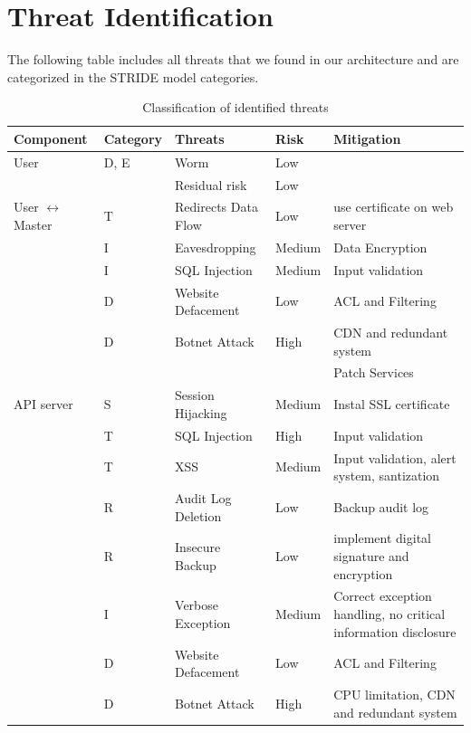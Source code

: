 \section{Threat Identification}
The following table includes all threats that we found in our architecture and are categorized in the STRIDE model categories.
\begin{longtable}[h!]{p{2.1cm} p{1.8cm} p{3cm} p{2cm} p{3.5cm}}
    \caption{\label{tab:threats-classification}Classification of identified threats}
    \endfirsthead
    \textbf{Component} & \textbf{Category} & \textbf{Threats} & \textbf{Risk} & \textbf{Mitigation} \\
    \endhead
    \hline
    User                & D, E & Worm & Low & \\
                        & & Residual risk & Low & \\
    \hline
    User \(\leftrightarrow\) Master   
                        & T & Redirects Data Flow & Low & use certificate on web server \\ 
                        & I & Eavesdropping & Medium & Data Encryption \\
                        & I & SQL Injection & Medium & Input validation \\
                        & D & Website Defacement & Low & ACL and Filtering \\
                        & D & Botnet Attack & High & CDN and redundant system \\
                        & & & & Patch Services \\
    \hline
    API server          & S & Session Hijacking & Medium & Instal SSL certificate \\
                        & T & SQL Injection & High & Input validation \\
                        & T & XSS & Medium & Input validation, alert system, santization \\
                        & R & Audit Log Deletion & Low & Backup audit log \\
                        & R & Insecure Backup & Low & implement digital signature and encryption \\
                        & I & Verbose Exception & Medium & Correct exception handling, no critical information disclosure \\
                        & D & Website Defacement & Low & ACL and Filtering \\
                        & D & Botnet Attack & High & CPU limitation, CDN and redundant system \\

\end{longtable}
